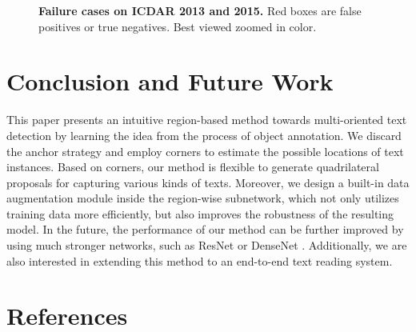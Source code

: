 \documentclass[3p, times]{elsarticle}
\begin{document}
\begin{figure}[!htb]
  \centering
  \hspace{-0.5ex}
  \hspace{-0.5ex}
  \caption{\textbf{Failure cases on ICDAR 2013 and 2015.} Red boxes are false positives or true negatives. Best viewed zoomed in color.}
  \label{Fig_6} 
\end{figure}




\section{Conclusion and Future Work}
This paper presents an intuitive region-based method towards multi-oriented text detection by learning the idea from the process of object annotation. We discard the anchor strategy and employ corners to estimate the possible locations of text instances. Based on corners, our method is flexible to generate quadrilateral proposals for capturing various kinds of texts. Moreover, we design a built-in data augmentation module inside the region-wise subnetwork, which not only utilizes training data more efficiently, but also improves the robustness of the resulting model. In the future, the performance of our method can be further improved by using much stronger networks, such as ResNet \cite{RESNET2016CVPR} or DenseNet \cite{DENSENET2017CVPR}. Additionally, we are also interested in extending this method to an end-to-end text reading system. 





\section*{References}


\end{document}
